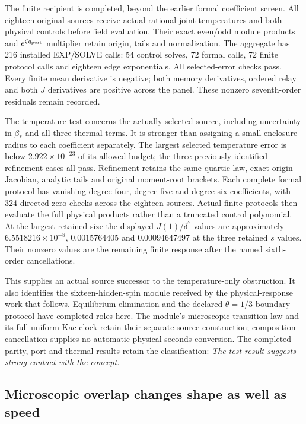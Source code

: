 The finite recipient is completed, beyond the earlier formal coefficient screen. All eighteen original sources receive actual rational joint temperatures and both physical controls before field evaluation. Their exact even/odd module products and $e^{\zeta q_{\rm port}}$ multiplier retain origin, tails and normalization. The aggregate has 216 installed EXP/SOLVE calls: 54 control solves, 72 formal calls, 72 finite protocol calls and eighteen edge exponentials. All selected-error checks pass. Every finite mean derivative is negative; both memory derivatives, ordered relay and both $J$ derivatives are positive across the panel. These nonzero seventh-order residuals remain recorded.

The temperature test concerns the actually selected source, including uncertainty in $\beta_*$ and all three thermal terms. It is stronger than assigning a small enclosure radius to each coefficient separately. The largest selected temperature error is below $2.922\times10^{-23}$ of its allowed budget; the three previously identified refinement cases all pass. Refinement retains the same quartic law, exact origin Jacobian, analytic tails and original moment-root brackets. Each complete formal protocol has vanishing degree-four, degree-five and degree-six coefficients, with 324 directed zero checks across the eighteen sources. Actual finite protocols then evaluate the full physical products rather than a truncated control polynomial. At the largest retained size the displayed $J(1)/\delta^7$ values are approximately $6.5518216\times10^{-8}$, $0.0015764405$ and $0.00094647497$ at the three retained $s$ values. Their nonzero values are the remaining finite response after the named sixth-order cancellations.

This supplies an actual source successor to the temperature-only obstruction. It also identifies the sixteen-hidden-spin module received by the physical-response work that follows. Equilibrium elimination and the declared $\theta=1/3$ boundary protocol have completed roles here. The module's microscopic transition law and its full uniform Kac clock retain their separate source construction; composition cancellation supplies no automatic physical-seconds conversion. The completed parity, port and thermal results retain the classification: \emph{The test result suggests strong contact with the concept.}

\subsection{Microscopic overlap changes shape as well as speed}

